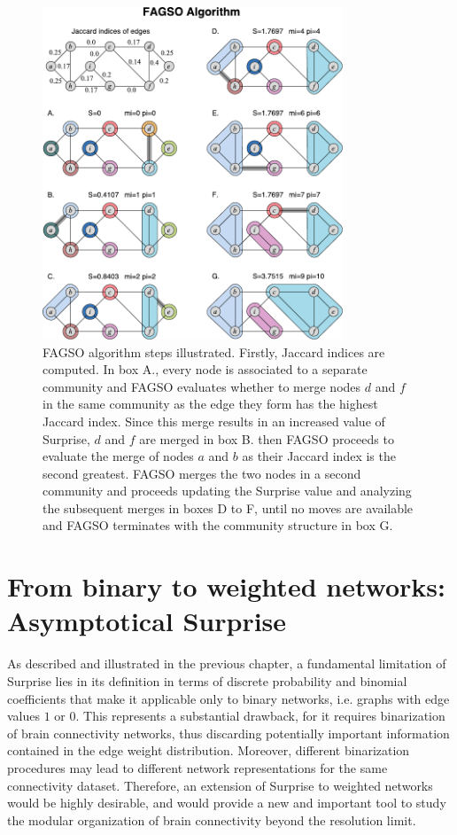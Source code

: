 \begin{figure}[htb!]
\centering
\includegraphics[width=0.8\textwidth]{images/fagso.pdf}
\caption{FAGSO algorithm steps illustrated. Firstly, Jaccard indices are computed. In box A., every node is associated to a separate community and FAGSO evaluates whether to merge nodes $d$ and $f$ in the same community as the edge they form has the highest Jaccard index. Since this merge results in an increased value of Surprise, $d$ and $f$ are merged in box B. then FAGSO proceeds to evaluate the merge of nodes $a$ and $b$ as their Jaccard index is the second greatest. FAGSO merges the two nodes in a second community and proceeds updating the Surprise value and analyzing the subsequent merges in boxes D to F, until no moves are available and FAGSO terminates with the community structure in box G.}
\label{fig:fagso_working}
\end{figure}


\section{From binary to weighted networks: Asymptotical Surprise}
As described and illustrated in the previous chapter, a fundamental limitation of Surprise lies in its definition in terms of discrete probability and binomial coefficients that make it applicable only to binary networks, i.e. graphs with edge values $1$ or $0$.
This represents a substantial drawback, for it requires binarization of brain connectivity networks, thus discarding potentially important information contained in the edge weight distribution.
Moreover, different binarization procedures may lead to different network representations for the same connectivity dataset.
Therefore, an extension of Surprise to weighted networks would be highly desirable, and would provide a new and important tool to study the modular organization of brain connectivity beyond the resolution limit.

